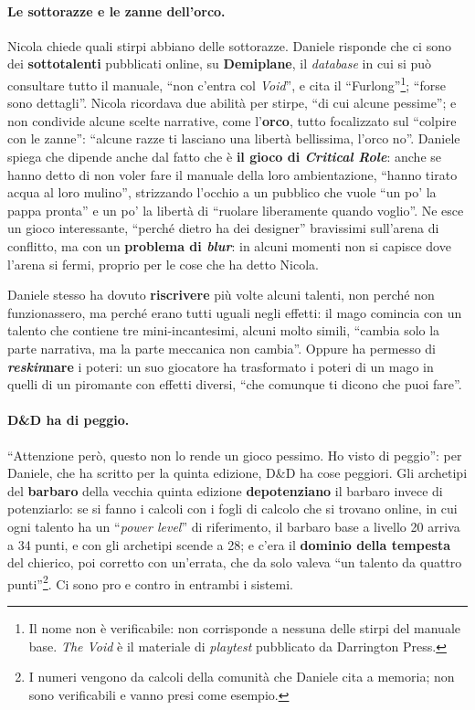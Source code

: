 \paragraph{Le sottorazze e le zanne dell'orco.} Nicola chiede quali stirpi abbiano delle sottorazze.
Daniele risponde che ci sono dei \textbf{sottotalenti} pubblicati online, su \textbf{Demiplane}, il
\emph{database} in cui si può consultare tutto il manuale, ``non c'entra col \emph{Void}'', e cita il
``Furlong''\footnote{Il nome non è verificabile: non corrisponde a nessuna delle stirpi del manuale
base. \emph{The Void} è il materiale di \emph{playtest} pubblicato da Darrington Press.}; ``forse sono
dettagli''. Nicola ricordava due abilità per stirpe, ``di cui alcune pessime''; e non condivide alcune
scelte narrative, come l'\textbf{orco}, tutto focalizzato sul ``colpire con le zanne'': ``alcune razze
ti lasciano una libertà bellissima, l'orco no''. Daniele spiega che dipende anche dal fatto che è
\textbf{il gioco di \emph{Critical Role}}: anche se hanno detto di non voler fare il manuale della loro
ambientazione, ``hanno tirato acqua al loro mulino'', strizzando l'occhio a un pubblico che vuole ``un
po' la pappa pronta'' e un po' la libertà di ``ruolare liberamente quando voglio''. Ne esce un gioco
interessante, ``perché dietro ha dei designer'' bravissimi sull'arena di conflitto, ma con un
\textbf{problema di \emph{blur}}: in alcuni momenti non si capisce dove l'arena si fermi, proprio per le
cose che ha detto Nicola.

Daniele stesso ha dovuto \textbf{riscrivere} più volte alcuni talenti, non perché non funzionassero, ma
perché erano tutti uguali negli effetti: il mago comincia con un talento che contiene tre
mini-incantesimi, alcuni molto simili, ``cambia solo la parte narrativa, ma la parte meccanica non
cambia''. Oppure ha permesso di \textbf{\emph{reskin}nare} i poteri: un suo giocatore ha trasformato i
poteri di un mago in quelli di un piromante con effetti diversi, ``che comunque ti dicono che puoi
fare''.

\paragraph{D\&D ha di peggio.} ``Attenzione però, questo non lo rende un gioco pessimo. Ho visto di
peggio'': per Daniele, che ha scritto per la quinta edizione, D\&D ha cose peggiori. Gli archetipi del
\textbf{barbaro} della vecchia quinta edizione \textbf{depotenziano} il barbaro invece di potenziarlo:
se si fanno i calcoli con i fogli di calcolo che si trovano online, in cui ogni talento ha un
``\emph{power level}'' di riferimento, il barbaro base a livello 20 arriva a 34 punti, e con gli
archetipi scende a 28; e c'era il \textbf{dominio della tempesta} del chierico, poi corretto con
un'errata, che da solo valeva ``un talento da quattro punti''\footnote{I numeri vengono da calcoli
della comunità che Daniele cita a memoria; non sono verificabili e vanno presi come esempio.}. Ci sono
pro e contro in entrambi i sistemi.

